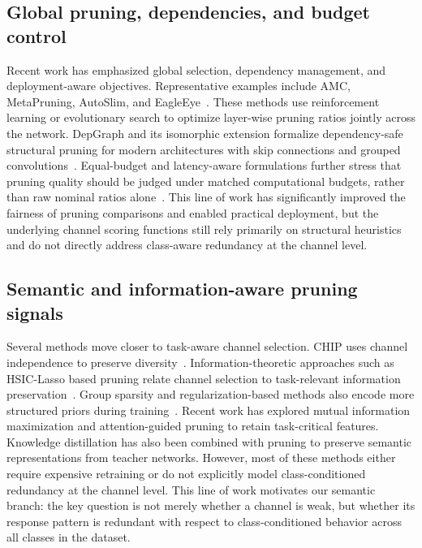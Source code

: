 \documentclass[preprint,12pt]{elsarticle}
\begin{document}
\subsection{Global pruning, dependencies, and budget control}

Recent work has emphasized global selection, dependency management, and deployment-aware objectives. Representative examples include AMC, MetaPruning, AutoSlim, and EagleEye~\cite{he2018amc,liu2019metapruning,yu2020autoslim,li2020eagleeye}. These methods use reinforcement learning or evolutionary search to optimize layer-wise pruning ratios jointly across the network. DepGraph and its isomorphic extension formalize dependency-safe structural pruning for modern architectures with skip connections and grouped convolutions~\cite{fang2023depgraph,fang2024isomorphic}. Equal-budget and latency-aware formulations further stress that pruning quality should be judged under matched computational budgets, rather than raw nominal ratios alone~\cite{shen2022halp}. This line of work has significantly improved the fairness of pruning comparisons and enabled practical deployment, but the underlying channel scoring functions still rely primarily on structural heuristics and do not directly address class-aware redundancy at the channel level.

\subsection{Semantic and information-aware pruning signals}

Several methods move closer to task-aware channel selection. CHIP uses channel independence to preserve diversity~\cite{sui2021chip}. Information-theoretic approaches such as HSIC-Lasso based pruning relate channel selection to task-relevant information preservation~\cite{guo2023apib}. Group sparsity and regularization-based methods also encode more structured priors during training~\cite{wen2016learning,wang2021greg}. Recent work has explored mutual information maximization and attention-guided pruning to retain task-critical features. Knowledge distillation has also been combined with pruning to preserve semantic representations from teacher networks. However, most of these methods either require expensive retraining or do not explicitly model class-conditioned redundancy at the channel level. This line of work motivates our semantic branch: the key question is not merely whether a channel is weak, but whether its response pattern is redundant with respect to class-conditioned behavior across all classes in the dataset.
\end{document}
